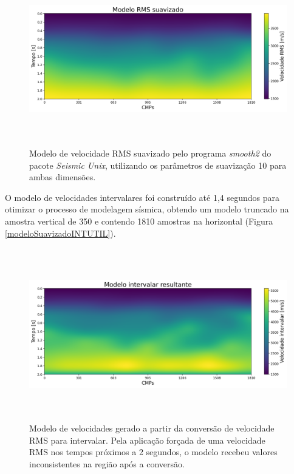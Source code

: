 \documentclass[
	12pt,				%
	openright,			%
	oneside,			%
	a4paper,			%
	english,			%
	brazil				%
	]{abntex2}
\begin{document}
	\newpage
    \begin{figure}[htp!]
		\centering
		\includegraphics[width=16cm,height=7.5cm]{../imagens/modeloSuavizadoRMS.png}
		\caption{Modelo de velocidade RMS suavizado pelo programa \textit{smooth2} do pacote \textit{Seismic Unix}, utilizando os parâmetros de suavização 10 para ambas dimensões.}
		\label{modeloSuavizadoRMS}
	\end{figure}

	O modelo de velocidades intervalares foi construído até 1,4 segundos para otimizar o processo de modelagem sísmica, obtendo um modelo truncado na amostra vertical de 350 e contendo 1810 amostras na horizontal (Figura \ref{modeloSuavizadoINTUTIL}).  	

    \begin{figure}[htp!]
		\centering
		\includegraphics[width=16cm,height=7.5cm]{../imagens/modeloSuavizadoINT.png}
		\caption{Modelo de velocidades gerado a partir da conversão de velocidade RMS para intervalar. Pela aplicação forçada de uma velocidade RMS nos tempos próximos a 2 segundos, o modelo recebeu valores inconsistentes na região após a conversão.}
		\label{modeloSuavizadoINT}
	\end{figure}
\end{document}
